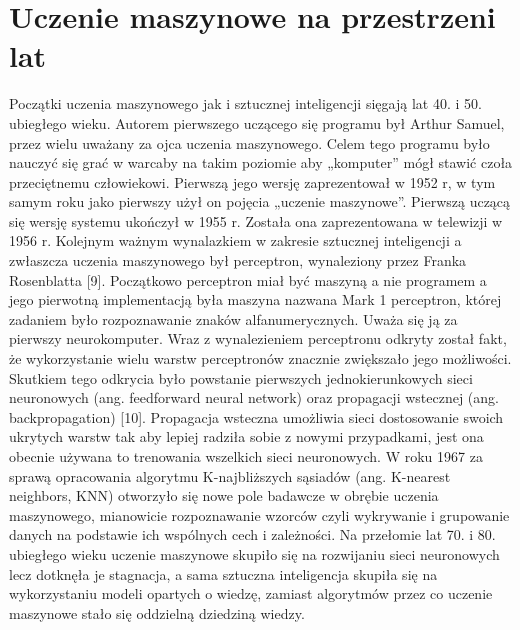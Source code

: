 \documentclass[a4paper,12pt,oneside]{book}
\begin{document}
\section{Uczenie maszynowe na przestrzeni lat}
Początki uczenia maszynowego jak i sztucznej inteligencji sięgają lat 40. i 50. ubiegłego wieku. Autorem pierwszego uczącego się programu był Arthur Samuel, przez wielu uważany za ojca uczenia maszynowego. Celem tego programu było nauczyć się grać w warcaby na takim poziomie aby „komputer” mógł stawić czoła przeciętnemu człowiekowi. Pierwszą jego wersję zaprezentował w 1952 r, w tym samym roku jako pierwszy użył on pojęcia „uczenie maszynowe”. Pierwszą uczącą się wersję systemu ukończył w 1955 r. Została ona zaprezentowana w telewizji w 1956 r. Kolejnym ważnym wynalazkiem w zakresie sztucznej inteligencji a zwłaszcza uczenia maszynowego był perceptron, wynaleziony przez Franka Rosenblatta [9]. Początkowo perceptron miał być maszyną a nie programem a jego pierwotną implementacją była maszyna nazwana Mark 1 perceptron, której zadaniem było rozpoznawanie znaków alfanumerycznych. Uważa się ją za pierwszy neurokomputer. Wraz z wynalezieniem perceptronu odkryty został fakt, że wykorzystanie wielu warstw perceptronów znacznie zwiększało jego możliwości. Skutkiem tego odkrycia było powstanie pierwszych jednokierunkowych sieci neuronowych (ang. feedforward neural network) oraz propagacji wstecznej (ang. backpropagation) [10]. Propagacja wsteczna umożliwia sieci dostosowanie swoich ukrytych warstw tak aby lepiej radziła sobie z nowymi przypadkami, jest ona obecnie używana to trenowania wszelkich sieci neuronowych. W roku 1967 za sprawą opracowania algorytmu K-najbliższych sąsiadów (ang. K-nearest neighbors, KNN) otworzyło się nowe pole badawcze w obrębie uczenia maszynowego, mianowicie rozpoznawanie wzorców czyli wykrywanie i grupowanie danych na podstawie ich wspólnych cech i zależności. Na przełomie lat 70. i 80. ubiegłego wieku uczenie maszynowe skupiło się na rozwijaniu sieci neuronowych lecz dotknęła je stagnacja, a sama sztuczna inteligencja skupiła się na wykorzystaniu modeli opartych o wiedzę, zamiast algorytmów przez co uczenie maszynowe stało się oddzielną dziedziną wiedzy. 
\end{document}
